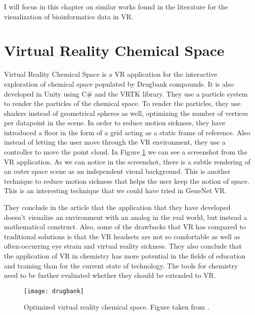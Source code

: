 I will focus in this chapter on similar works found in the literature for the visualization of bioinformatics data in VR.

\section{Virtual Reality Chemical Space}
Virtual Reality Chemical Space is a VR application for the interactive exploration of chemical space populated by Drugbank compounds\cite{drugbank}. It is also developed in Unity using C\# and the VRTK library. They use a particle system to render the particles of the chemical space. To render the particles, they use shaders instead of geometrical spheres as well, optimizing the number of vertices per datapoint in the scene. In order to reduce motion sickness, they have introduced a floor in the form of a grid acting as a static frame of reference. Also instead of letting the user move through the VR environment, they use a controller to move the point cloud. In Figure \ref{fig:drugbank} we can see a screenshot from the VR application. As we can notice in the screenshot, there is a subtle rendering of an outer space scene as an independent visual background. This is another technique to reduce motion sickness that helps the user keep the notion of space. This is an interesting technique that we could have tried in GeneNet VR.

They conclude in the article that the application that they have developed doesn't visualize an environment with an analog in the real world, but instead a mathematical construct. Also, some of the drawbacks that VR has compared to traditional solutions is that the VR headsets are not so comfortable as well as often-occurring eye strain and virtual reality sickness. They also conclude that the application of VR in chemistry has more potential in the fields of education and training than for the current state of technology. The tools for chemistry need to be further evaluated whether they should be extended to VR.

\begin{figure}[h!]
    \centering%
    \texttt{[image: drugbank]}
    \caption{Optimized virtual reality chemical space. Figure taken from \cite{drugbank}.}
    \label{fig:drugbank}
\end{figure}%

